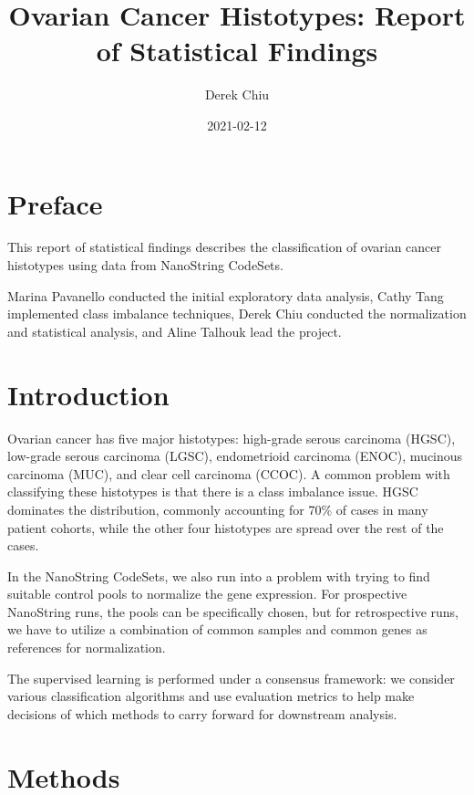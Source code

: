 \documentclass[
]{report}
\title{Ovarian Cancer Histotypes: Report of Statistical Findings}
\author{Derek Chiu}
\date{2021-02-12}
\begin{document}
\maketitle

{
\hypersetup{linkcolor=}
\setcounter{tocdepth}{1}
\tableofcontents
}
\listoftables
\listoffigures
\hypertarget{preface}{%
\chapter*{Preface}\label{preface}}

This report of statistical findings describes the classification of ovarian cancer histotypes using data from NanoString CodeSets.

Marina Pavanello conducted the initial exploratory data analysis, Cathy Tang implemented class imbalance techniques, Derek Chiu conducted the normalization and statistical analysis, and Aline Talhouk lead the project.

\hypertarget{introduction}{%
\chapter{Introduction}\label{introduction}}

Ovarian cancer has five major histotypes: high-grade serous carcinoma (HGSC), low-grade serous carcinoma (LGSC), endometrioid carcinoma (ENOC), mucinous carcinoma (MUC), and clear cell carcinoma (CCOC). A common problem with classifying these histotypes is that there is a class imbalance issue. HGSC dominates the distribution, commonly accounting for 70\% of cases in many patient cohorts, while the other four histotypes are spread over the rest of the cases.

In the NanoString CodeSets, we also run into a problem with trying to find suitable control pools to normalize the gene expression. For prospective NanoString runs, the pools can be specifically chosen, but for retrospective runs, we have to utilize a combination of common samples and common genes as references for normalization.

The supervised learning is performed under a consensus framework: we consider various classification algorithms and use evaluation metrics to help make decisions of which methods to carry forward for downstream analysis.

\hypertarget{methods}{%
\chapter{Methods}\label{methods}}
\end{document}
